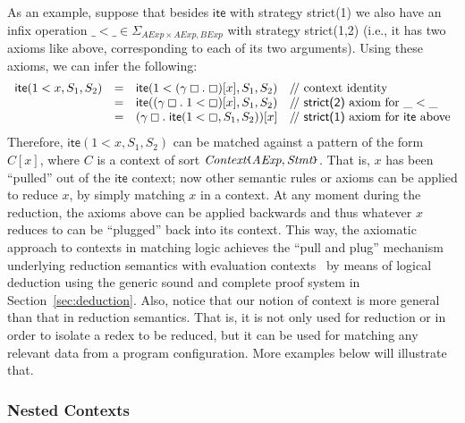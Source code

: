 \documentclass[UTF8,11pt]{article}
\theoremstyle{plain}
\theoremstyle{definition}
\theoremstyle{remark}
\newcommand{\Context}{\textit{Context}}
\newcommand{\hole}{\boxempty}
\newcommand{\AExp}{\textit{AExp}}
\newcommand{\BExp}{\textit{BExp}}
\newcommand{\Stmt}{\textit{Stmt}}
\newcommand{\ite}{\textsf{ite}}
\newcommand{\parametric}[2]{{#1}\raisebox{.2ex}{\texttt{\footnotesize{\{}}}#2\raisebox{.2ex}{\texttt{\footnotesize{\}}}}}
\newcommand{\doubleslash}{/\!/{ }}
\begin{document}
As an example, suppose that besides $\ite$ with strategy \textsf{strict(1)}
we also have an infix operation $\_<\_\in\Sigma_{\AExp\times\AExp,\BExp}$ with
strategy \textsf{strict(1,2)}
(i.e., it has two axioms like above, corresponding to each of its two
arguments).
Using these axioms, we can infer the following:
$$
\begin{array}{rcll}
\ite(1 < x,S_1,S_2) & = &
\ite(1 < (\gamma\hole.\;\hole)[x],S_1,S_2)
& \textrm{\doubleslash context identity}
\\
& = &
\ite((\gamma\hole.\;1 < \hole)[x],S_1,S_2)
& \textrm{\doubleslash \textsf{strict(2)} axiom for $\_<\_$}
\\
& = &
(\gamma\hole.\;\ite(1 < \hole,S_1,S_2))[x]
& \textrm{\doubleslash \textsf{strict(1)} axiom for $\ite$ above}
\end{array}
$$
Therefore, $\ite(1 < x,S_1,S_2)$ can be matched against a pattern
of the form $C[x]$, where $C$ is a context of sort
$\parametric{\Context}{\AExp,\Stmt}$.
That is, $x$ has been ``pulled'' out of the $\ite$ context;
now other semantic rules or axioms can be applied to reduce $x$, by
simply matching $x$ in a context.
At any moment during the reduction, the axioms above can be applied
backwards and thus whatever $x$ reduces to can be ``plugged'' back into
its context.
This way, the axiomatic approach to contexts in matching logic
achieves the ``pull and plug'' mechanism underlying reduction
semantics with evaluation contexts~\cite{felleisen-hieb-92} by
means of logical deduction using the generic sound and complete
proof system in Section~\ref{sec:deduction}.
Also, notice that our notion of context is more general than
that in reduction semantics.
That is, it is not only used for reduction or in order to isolate
a redex to be reduced, but it can be used for matching any relevant
data from a program configuration.
More examples below will illustrate that.

\subsubsection{Nested Contexts}
\end{document}
